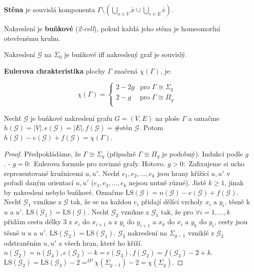 \begin{definice}
	\textbf{Stěna} je souvislá komponenta $\Gamma \setminus (\bigcup_{x \in V} \bar{x} \cup \bigcup_{e \in E} \bar{e})$.
\end{definice}

\begin{definice}
	Nakreslení je \textbf{buňkové} (\textit{2-cell}), pokud každá jeho stěna je homeomorfní otevřenému kruhu.
\end{definice}

\begin{fakt}
	Nakreslení $\mathcal{G}$ na $\Sigma_{0}$ je buňkové iff nakreslený graf je souvislý.
\end{fakt}

\begin{definice}
	\textbf{Eulerova chrakteristika} plochy $\Gamma$ značená $\chi (\Gamma)$, je:
	
	$$
	\chi(\Gamma) =
	\left\{
	\begin{array}{ll}
		2 - 2g & \text{pro } \Gamma \cong \Sigma_{g} \\
		2 - g & \text{pro } \Gamma \cong \Pi_{g} \\
	\end{array}
	\right.
	$$
\end{definice}

\begin{veta}
	Nechť $\mathcal{G}$ je buňkové nakreslení grafu $G=(V,E)$ na ploše $\Gamma$ a označme $h(\mathcal{G}) = |V|, e(\mathcal{G}) = |E|, f(\mathcal{G})=\text{\# stěn }\mathcal{G}$. Potom $h(\mathcal{G}) - e(\mathcal{G}) + f(\mathcal{G}) = \chi(\Gamma)$.
\end{veta}

\begin{proof}
	Předpokládáme, že $\Gamma \cong \Sigma_{g}$ (případně $\Gamma \cong \Pi_{g}$ je podobný). Indukcí podle $g$.
	- $g=0:$ Eulerova formule pro rovinné grafy. Hotovo. $g>0:$ Zafixujeme si ucho reprezentované kružnicemi $u,u'$. Nechť $e_{1},e_{2},\dots,e_{k}$ jsou hrany křížící $u,u'$ v pořadí daným orientací $u,u'$ ($e_{1},e_{2}, \dots, e_{k}$ nejsou nutně různé). Jistě $k \geq 1$, jinak by nakreslení nebylo buňkové. Označme $\text{LS}(\mathcal{G}) = n(\mathcal{G}) - e(\mathcal{G}) + f(\mathcal{G})$. Nechť $\mathcal{G}_{1}$ vznikne z $\mathcal{G}$ tak, že se na každou $e_{i}$ přidají dělící vrcholy $x_{i}$ a $y_{i}$, těsně k $u$ a $u'$. $\text{LS}(\mathcal{G}_{1}) = \text{LS}(\mathcal{G})$. Nechť $\mathcal{G}_{2}$ vznikne z $\mathcal{G}_{1}$ tak, že pro $\forall i = 1, \dots , k$ přidám cestu délky 3 z $x_{i}$ do $x_{i+1}$ a z $y_{i}$ do $y_{i+1}$ a $x_{k}$ do $x_{i}$ a $y_{k}$ do $y_{i}$, cesty jsou těsně u $u$ a $u'$. $\text{LS}(\mathcal{G}_{2}) = \text{LS}(\mathcal{G}_{1})$. $\mathcal{G}_{3}$ nakreslení na $\Sigma_{g-1}$ vzniklé z $\mathcal{G}_{2}$ odstraněním $u,u'$ a všech hran, které ho kříží. $n(\mathcal{G}_{2}) = n(\mathcal{G}_{3}), e(\mathcal{G}_{2}) - k = e(\mathcal{G}_{3}), f(\mathcal{G}_{2}) = f(\mathcal{G}_{3}) - 2 + k$. $\text{LS}(\mathcal{G}_{2}) = \text{LS}(\mathcal{G}_{3}) - 2 =^{IP} \chi(\Sigma_{g-1}) - 2 = \chi(\Sigma_{g})$.
\end{proof}

